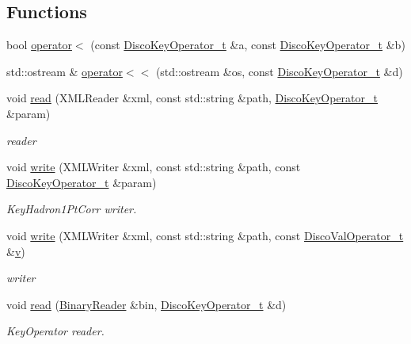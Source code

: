 \subsection*{Functions}
\begin{DoxyCompactItemize}
\item 
bool \mbox{\hyperlink{namespaceFF_a84e77b5ad9222ac85655c36949abf276}{operator$<$}} (const \mbox{\hyperlink{structFF_1_1DiscoKeyOperator__t}{Disco\+Key\+Operator\+\_\+t}} \&a, const \mbox{\hyperlink{structFF_1_1DiscoKeyOperator__t}{Disco\+Key\+Operator\+\_\+t}} \&b)
\item 
std\+::ostream \& \mbox{\hyperlink{namespaceFF_ac2ee6d46f8316f1f3631105fbeab604c}{operator$<$$<$}} (std\+::ostream \&os, const \mbox{\hyperlink{structFF_1_1DiscoKeyOperator__t}{Disco\+Key\+Operator\+\_\+t}} \&d)
\item 
void \mbox{\hyperlink{namespaceFF_a4e59e8e764d20bb787e2992c247ca80f}{read}} (X\+M\+L\+Reader \&xml, const std\+::string \&path, \mbox{\hyperlink{structFF_1_1DiscoKeyOperator__t}{Disco\+Key\+Operator\+\_\+t}} \&param)
\begin{DoxyCompactList}\small\item\em reader \end{DoxyCompactList}\item 
void \mbox{\hyperlink{namespaceFF_a831b58b450a964b114e0fce65fc4de99}{write}} (X\+M\+L\+Writer \&xml, const std\+::string \&path, const \mbox{\hyperlink{structFF_1_1DiscoKeyOperator__t}{Disco\+Key\+Operator\+\_\+t}} \&param)
\begin{DoxyCompactList}\small\item\em Key\+Hadron1\+Pt\+Corr writer. \end{DoxyCompactList}\item 
void \mbox{\hyperlink{namespaceFF_a0c22ea2c009e3006aa0f745b9a3e2cc2}{write}} (X\+M\+L\+Writer \&xml, const std\+::string \&path, const \mbox{\hyperlink{classFF_1_1DiscoValOperator__t}{Disco\+Val\+Operator\+\_\+t}} \&\mbox{\hyperlink{adat__devel_2lib_2hadron_2hadron__timeslice_8cc_a716fc87f5e814be3ceee2405ed6ff22a}{v}})
\begin{DoxyCompactList}\small\item\em writer \end{DoxyCompactList}\item 
void \mbox{\hyperlink{namespaceFF_a90d854af01e30d52191dff4341fcd4ad}{read}} (\mbox{\hyperlink{classADATIO_1_1BinaryReader}{Binary\+Reader}} \&bin, \mbox{\hyperlink{structFF_1_1DiscoKeyOperator__t}{Disco\+Key\+Operator\+\_\+t}} \&d)
\begin{DoxyCompactList}\small\item\em Key\+Operator reader. \end{DoxyCompactList}\item 

\end{DoxyCompactItemize}
